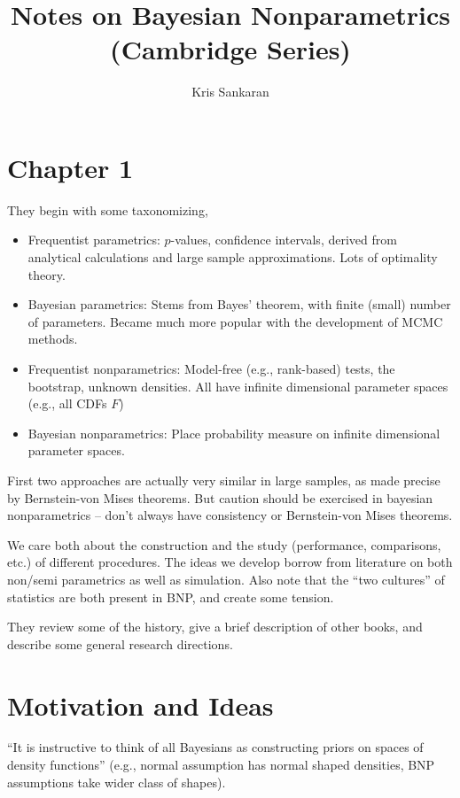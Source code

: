 \documentclass{article}
\title{Notes on Bayesian Nonparametrics (Cambridge Series)}
\author{Kris Sankaran}
\begin{document}
\maketitle

\section{Chapter 1}

They begin with some taxonomizing,

\begin{itemize}
\item Frequentist parametrics: $p$-values, confidence intervals, derived from
  analytical calculations and large sample approximations. Lots of optimality
  theory.
  \item Bayesian parametrics: Stems from Bayes' theorem, with finite (small)
    number of parameters. Became much more popular with the development of MCMC
    methods.
  \item Frequentist nonparametrics: Model-free (e.g., rank-based) tests, the
    bootstrap, unknown densities. All have infinite dimensional parameter spaces
    (e.g., all CDFs $F$)
  \item Bayesian nonparametrics: Place probability measure on infinite
    dimensional parameter spaces.
\end{itemize}

First two approaches are actually very similar in large samples, as made precise
by Bernstein-von Mises theorems. But caution should be exercised in bayesian
nonparametrics -- don't always have consistency or Bernstein-von Mises theorems.

We care both about the construction and the study (performance, comparisons,
etc.) of different procedures. The ideas we develop borrow from literature on
both non/semi parametrics as well as simulation. Also note that the ``two
cultures'' of statistics are both present in BNP, and create some tension.

They review some of the history, give a brief description of other books, and
describe some general research directions.

\section{Motivation and Ideas}

``It is instructive to think of all Bayesians as constructing priors on spaces
of density functions'' (e.g., normal assumption has normal shaped densities, BNP
assumptions take wider class of shapes).
\end{document}
